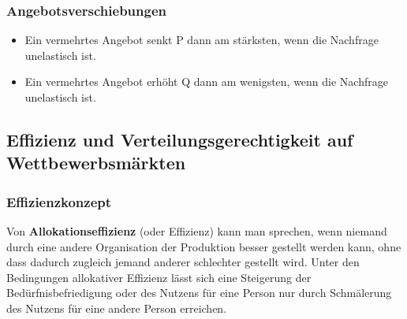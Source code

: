 \documentclass[10pt]{scrartcl}
\begin{document}
\subsubsection{Angebotsverschiebungen}
\begin{itemize}
\item  Ein vermehrtes Angebot senkt P dann am stärksten, wenn die Nachfrage unelastisch ist. 
\item Ein vermehrtes Angebot erhöht Q dann am wenigsten, wenn die Nachfrage unelastisch ist.
\end{itemize}
\subsection{Effizienz und Verteilungsgerechtigkeit auf Wettbewerbsmärkten}
\subsubsection{Effizienzkonzept}
Von {\bf Allokationseffizienz }(oder Effizienz) kann man sprechen, wenn niemand durch eine andere Organisation der Produktion besser gestellt werden kann, ohne dass dadurch zugleich jemand anderer schlechter gestellt wird. Unter den Bedingungen allokativer Effizienz lässt sich eine Steigerung der Bedürfnisbefriedigung oder des Nutzens für eine Person nur durch Schmälerung des Nutzens für eine andere Person erreichen. 
\end{document}
